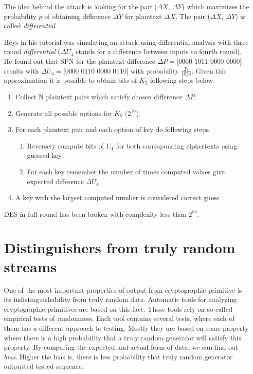 \documentclass[
    digital,    %
    oneside,    %
    color,
    11pt,
    nocover,
    notable,
    nolof,
    nolot,
    final
]{fithesis3}
\renewcommand\_{\textunderscore\allowbreak}
\begin{document}
The idea behind the attack is looking for the pair ($\Delta X$, $\Delta Y$) which maximizes the probability $p$ of obtaining difference $\Delta Y$ for plaintext $\Delta X$. The pair ($\Delta X$, $\Delta Y$) is called \textit{differential}.

Heys in his tutorial \cite{human-cryptanalysis} was simulating an attack using differential analysis with three round \textit{differential} ($\Delta U_{4}$ stands for a difference between inputs to fourth round). He found out that SPN for the plaintext difference $\Delta P = [0000$ $1011$ $0000$ $0000]$ results with $\Delta U_{4} = [0000$ $0110$ $0000$ $0110]$ with probability $\frac{27}{1024}$. Given this approximation it is possible to obtain bits of $K_{5}$ following steps below.

\begin{enumerate}
	\item Collect N plaintext pairs which satisfy chosen difference $\Delta P$.
	\item Generate all possible options for $K_{5}$ ($2^{16}$).
	\item For each plaintext pair and each option of key do following steps.
	\begin{enumerate}
		\item Reversely compute bits of $U_{4}$ for both corresponding ciphertexts using guessed key.
		\item For each key remember the number of times computed values give expected difference $\Delta U_{4}$.
	\end{enumerate}
	\item A key with the largest computed number is considered correct guess.
\end{enumerate}

DES in full round has been broken with complexity less than $2^{55}$. \cite{Biham1991}

\section{Distinguishers from truly random streams}
\label{sec:statistical-tests}

One of the most important properties of output from cryptographic primitive is its indistinguishability from truly random data. Automatic tools for analyzing cryptographic primitives are based on this fact. Those tools rely on so-called empirical tests of randomness. Each tool contains several tests, where each of them has a different approach to testing. Mostly they are based on some property where there is a high probability that a truly random generator will satisfy this property. By comparing the expected and actual form of data, we can find out \textit{bias}. Higher the bias is, there is less probability that truly random generator outputted tested sequence.
\end{document}
